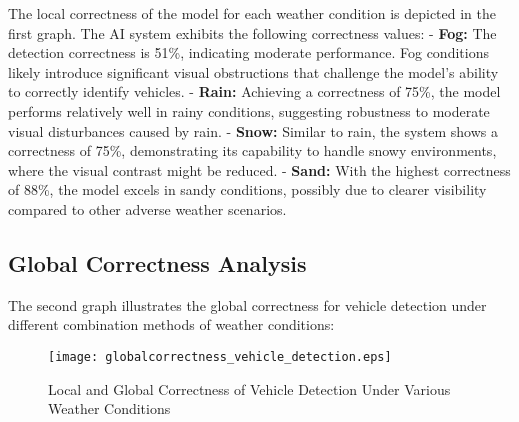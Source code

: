 The local correctness of the model for each weather condition is depicted in the first graph. The AI system exhibits the following correctness values:
- \textbf{Fog:} The detection correctness is 51\%, indicating moderate performance. Fog conditions likely introduce significant visual obstructions that challenge the model's ability to correctly identify vehicles.
- \textbf{Rain:} Achieving a correctness of 75\%, the model performs relatively well in rainy conditions, suggesting robustness to moderate visual disturbances caused by rain.
- \textbf{Snow:} Similar to rain, the system shows a correctness of 75\%, demonstrating its capability to handle snowy environments, where the visual contrast might be reduced.
- \textbf{Sand:} With the highest correctness of 88\%, the model excels in sandy conditions, possibly due to clearer visibility compared to other adverse weather scenarios.

\subsection{Global Correctness Analysis}

The second graph illustrates the global correctness for vehicle detection under different combination methods of weather conditions:


\begin{figure}[h]
  \centering
  \texttt{[image: globalcorrectness\_vehicle\_detection.eps]}
  \caption{Local and Global Correctness of Vehicle Detection Under Various Weather Conditions}
  \label{fig:global_correctness_vehicle_detection}
\end{figure}




